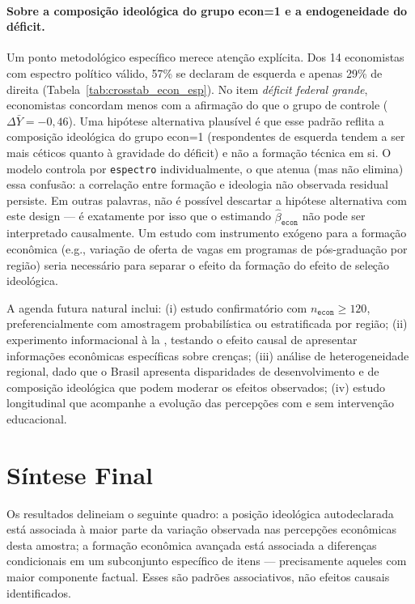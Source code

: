 \paragraph{Sobre a composição ideológica do grupo econ=1 e a endogeneidade do déficit.}
Um ponto metodológico específico merece atenção explícita. Dos 14 economistas com espectro político válido, 57\% se declaram de esquerda e apenas 29\% de direita (Tabela~\ref{tab:crosstab_econ_esp}). No item \textit{déficit federal grande}, economistas concordam menos com a afirmação do que o grupo de controle ($\Delta\bar{Y} = -0{,}46$). Uma hipótese alternativa plausível é que esse padrão reflita a composição ideológica do grupo econ=1 (respondentes de esquerda tendem a ser mais céticos quanto à gravidade do déficit) e não a formação técnica em si. O modelo controla por \texttt{espectro} individualmente, o que atenua (mas não elimina) essa confusão: a correlação entre formação e ideologia não observada residual persiste. Em outras palavras, não é possível descartar a hipótese alternativa com este design — é exatamente por isso que o estimando $\hat{\beta}_{\texttt{econ}}$ não pode ser interpretado causalmente. Um estudo com instrumento exógeno para a formação econômica (e.g., variação de oferta de vagas em programas de pós-graduação por região) seria necessário para separar o efeito da formação do efeito de seleção ideológica.

A agenda futura natural inclui: (i) estudo confirmatório com $n_{\texttt{econ}} \geq 120$, preferencialmente com amostragem probabilística ou estratificada por região; (ii) experimento informacional à la , testando o efeito causal de apresentar informações econômicas específicas sobre crenças; (iii) análise de heterogeneidade regional, dado que o Brasil apresenta disparidades de desenvolvimento e de composição ideológica que podem moderar os efeitos observados; (iv) estudo longitudinal que acompanhe a evolução das percepções com e sem intervenção educacional.

\section{Síntese Final}
\label{sec:sintese-final}

Os resultados delineiam o seguinte quadro: a posição ideológica autodeclarada está associada à maior parte da variação observada nas percepções econômicas desta amostra; a formação econômica avançada está associada a diferenças condicionais em um subconjunto específico de itens — precisamente aqueles com maior componente factual. Esses são padrões associativos, não efeitos causais identificados.

